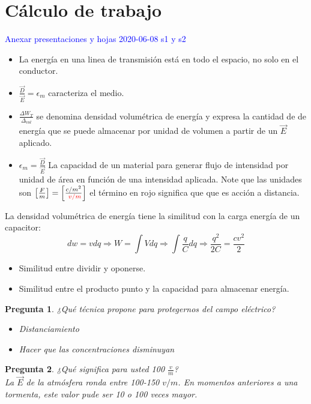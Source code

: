 \documentclass[12pt,letterpaper]{book}
\newtheorem{question}{Pregunta}[section]
\begin{document}
\section{Cálculo de trabajo}

\textcolor{blue}{Anexar presentaciones y hojas 2020-06-08 s1 y s2}
\begin{itemize}
\item La energía en una linea de transmisión está en todo el espacio, no solo en el conductor.
\item $\frac{ \vec{D}}{ \vec{E}}=\epsilon _m$ caracteriza el medio.
\item $\frac{\Delta W_T}{\Delta _{vol}}$ se denomina densidad volumétrica de energía y expresa la cantidad de de energía que se puede almacenar por unidad de volumen a partir de un $\vec{E}$ aplicado.
\item $\epsilon_m=\frac{ \vec{D}}{\vec{E}}$ La capacidad de un material para generar flujo de intensidad por unidad de área en función de una intensidad aplicada. Note que las unidades son $\left[ \frac{F}{m} \right]=\left[ \frac{c/m^2}{\text{ \textcolor{red}{$v/m$}} }\right]$ el término en rojo significa que que es acción a distancia. 
\end{itemize}

La densidad volumétrica de energía tiene la similitud con la carga energía de un capacitor:
\begin{equation}
dw=vdq \Rightarrow W=\int Vdq \Rightarrow \int \frac{q}{C} dq \Rightarrow \frac{q^2}{2C}=\frac{cv^2}{2}
\end{equation}

\begin{itemize}
\item Similitud entre dividir y oponerse.
\item Similitud entre el producto punto y la capacidad para almacenar energía.
\end{itemize}

\begin{question}
¿Qué técnica propone para protegernos del campo eléctrico?\\
\begin{itemize}
\item Distanciamiento
\item Hacer que las concentraciones disminuyan
\end{itemize}
\end{question}

\begin{question}
¿Qué significa para usted 100 $\frac{v}{m}$?\\
La $\vec{E}$ de la atmósfera ronda entre 100-150 $v/m$. En momentos anteriores a una tormenta, este valor pude ser 10 o 100 veces mayor. 
\end{question}
\end{document}
